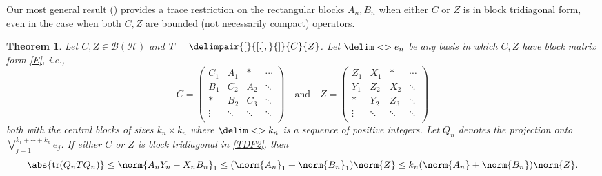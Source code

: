 \documentclass[10pt,reqno]{amsart}
\newtheorem{theorem}{Theorem}[section]
\theoremstyle{remark}
\newcommand{\BH}{\mathcal{B}(\Hil)}
\newcommand{\Hil}{\mathcal{H}}
\DeclareMathOperator{\trace}{tr}
\newcommand{\seq}{\delim<>}
\newcommand{\comm}{\delimpair{[}{[.],}{]}}
\numberwithin{equation}{section}
\begin{document}
Our most general result () provides a trace restriction on the rectangular blocks $A_n,B_n$ when either $C$ or $Z$ is in block tridiagonal form, even in the case when both $C,Z$ are bounded (not necessarily compact) operators.

\begin{theorem}
  \label{T.1}
  Let $C, Z \in \BH$ and $T = \comm{C}{Z}$.
  Let $\seq{e_n}$ be any basis in which $C,Z$ have block matrix form \eqref{E}, i.e.,
  \begin{equation}
    \label{TDF2}
    C =
    \begin{pmatrix}
      C_1 &  A_1  &*   & \cdots        \\
      B_1 & C_2&A_2  &  \ddots            \\
      * &B_2 &C_3 & \ddots             \\
      \vdots &\ddots &\ddots  &\ddots  \\
    \end{pmatrix}
    \quad \text{and} \quad
    Z =
    \begin{pmatrix}
      Z_1 &  X_1  &*   & \cdots        \\
      Y_1 & Z_2&X_2  &  \ddots            \\
      * &Y_2 &Z_3 & \ddots             \\
      \vdots &\ddots &\ddots  &\ddots  \\
    \end{pmatrix}
  \end{equation}
  both with the central blocks of sizes $k_n \times k_n$ where $\seq{k_n}$ is a sequence of positive integers.
  Let $Q_n$ denotes the projection onto $\bigvee_{j=1}^{k_1+\cdots+k_n} e_j$.
  If either $C$ or $Z$ is block tridiagonal in \eqref{TDF2}, then
  \begin{equation}
    \label{3.11}
    \abs{\trace(Q_n T Q_n)} \le \norm{A_n Y_n - X_n B_n}_1 \le (\norm{A_n}_1 + \norm{B_n}_1) \norm{Z} \le k_n(\norm{A_n} + \norm{B_n}) \norm{Z}.
  \end{equation}
\end{theorem}
\end{document}

